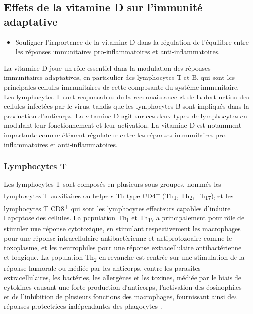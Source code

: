 \documentclass[
  a4paper,
  DIV=11,
  numbers=noendperiod,
  listof=totoc]{scrreprt}
\providecommand{\tightlist}{%
  \setlength{\itemsep}{0pt}\setlength{\parskip}{0pt}}\usepackage{longtable,booktabs,array}
\begin{document}
\hypertarget{effets-de-la-vitamine-d-sur-limmunituxe9-adaptative}{%
\subsection{Effets de la vitamine D sur l'immunité
adaptative}\label{effets-de-la-vitamine-d-sur-limmunituxe9-adaptative}}

\begin{itemize}
\tightlist
\item
  Souligner l'importance de la vitamine D dans la régulation de
  l'équilibre entre les réponses immunitaires pro-inflammatoires et
  anti-inflammatoires.
\end{itemize}

La vitamine D joue un rôle essentiel dans la modulation des réponses
immunitaires adaptatives, en particulier des lymphocytes T et B, qui
sont les principales cellules immunitaires de cette composante du
système immunitaire. Les lymphocytes T sont responsables de la
reconnaissance et de la destruction des cellules infectées par le virus,
tandis que les lymphocytes B sont impliqués dans la production
d'anticorps. La vitamine D agit sur ces deux types de lymphocytes en
modulant leur fonctionnement et leur activation. La vitamine D est
notamment importante comme élément régulateur entre les réponses
immunitaires pro-inflammatoires et anti-inflammatoires.

\hypertarget{lymphocytes-t}{%
\subsubsection{Lymphocytes T}\label{lymphocytes-t}}

Les lymphocytes T sont composés en plusieurs sous-groupes, nommés les
lymphocytes T auxiliaires ou helpers \acs{Th} type
CD4\textsuperscript{+} (Th\textsubscript{1}, Th\textsubscript{2},
Th\textsubscript{17}), et les lymphocytes T CD8\textsuperscript{+} qui
sont les lymphocytes effecteurs capables d'induire l'apoptose des
cellules. La population Th\textsubscript{1} et Th\textsubscript{17} a
principalement pour rôle de stimuler une réponse cytotoxique, en
stimulant respectivement les macrophages pour une réponse
intracellulaire antibactérienne et antiprotozoaire comme le toxoplasme,
et les neutrophiles pour une réponse extracellulaire antibactérienne et
fongique. La population Th\textsubscript{2} en revanche est centrée sur
une stimulation de la réponse humorale ou médiée par les anticorps,
contre les parasites extracellulaires, les bactéries, les allergènes et
les toxines, médiée par le biais de cytokines causant une forte
production d'anticorps, l'activation des éosinophiles et de l'inhibition
de plusieurs fonctions des macrophages, fournissant ainsi des réponses
protectrices indépendantes des phagocytes
\autocite{Cantorna.2015,Walker.2018}.
\end{document}
